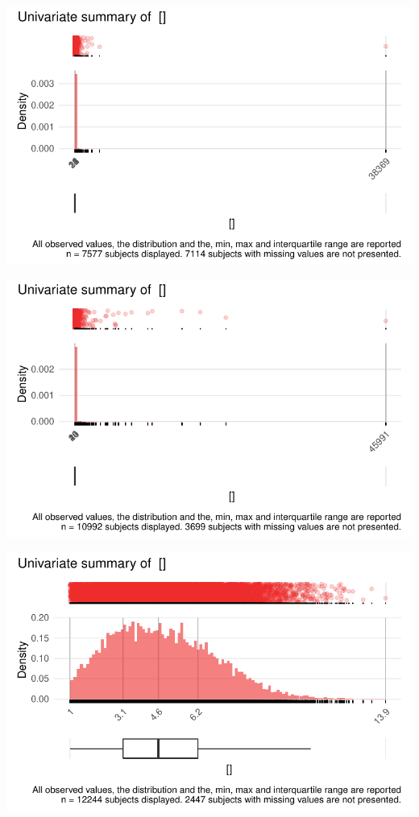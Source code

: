 \documentclass[
  letterpaper,
  DIV=11,
  numbers=noendperiod]{scrreport}
\begin{document}
\includegraphics{./Bact_univar_files/figure-pdf/uni04-23.pdf}

\includegraphics{./Bact_univar_files/figure-pdf/uni04-24.pdf}

\includegraphics{./Bact_univar_files/figure-pdf/uni04-25.pdf}
\end{document}
